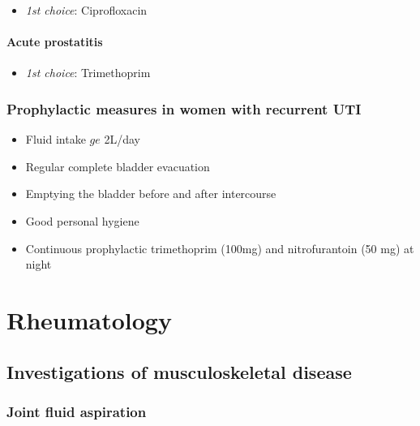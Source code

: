 \documentclass[
  12pt,
]{memoir}
\providecommand{\tightlist}{%
  \setlength{\itemsep}{0pt}\setlength{\parskip}{0pt}}
\begin{document}
\begin{itemize}
\tightlist
\item
  \emph{1st choice}: Ciprofloxacin
\end{itemize}

\hypertarget{acute-prostatitis}{%
\subsubsection{Acute prostatitis}\label{acute-prostatitis}}

\begin{itemize}
\tightlist
\item
  \emph{1st choice}: Trimethoprim
\end{itemize}

\hypertarget{prophylactic-measures-in-women-with-recurrent-uti}{%
\subsection{Prophylactic measures in women with recurrent
UTI}\label{prophylactic-measures-in-women-with-recurrent-uti}}

\begin{itemize}
\tightlist
\item
  Fluid intake \(ge\) 2L/day
\item
  Regular complete bladder evacuation
\item
  Emptying the bladder before and after intercourse
\item
  Good personal hygiene
\item
  Continuous prophylactic trimethoprim (100mg) and nitrofurantoin (50
  mg) at night
\end{itemize}

\pagebreak

\hypertarget{rheumatology}{%
\chapter{Rheumatology}\label{rheumatology}}

\hypertarget{investigations-of-musculoskeletal-disease}{%
\section{Investigations of musculoskeletal
disease}\label{investigations-of-musculoskeletal-disease}}

\hypertarget{joint-fluid-aspiration}{%
\subsection{Joint fluid aspiration}\label{joint-fluid-aspiration}}
\end{document}

